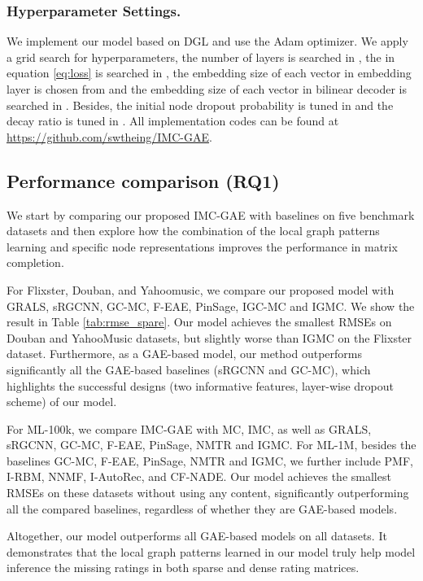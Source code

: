 \documentclass[sigconf]{acmart}
\begin{document}
\subsubsection{Hyperparameter Settings.} We implement our model based on DGL \cite{wang2019deep} and use the Adam optimizer. We apply a grid search for hyperparameters, the number of layers is searched in , the  in equation \ref{eq:loss} is searched in , the embedding size of each vector in embedding layer is chosen from  and the embedding size of each vector in bilinear decoder is searched in . Besides, the initial node dropout probability is tuned in  and the decay ratio  is tuned in . 
All implementation codes can be found at \url{https://github.com/swtheing/IMC-GAE}.



\subsection{Performance comparison (RQ1)}
We start by comparing our proposed IMC-GAE with baselines on five benchmark datasets and then explore how the combination of the local graph patterns learning and specific node representations improves the performance in matrix completion.

For Flixster, Douban, and Yahoomusic, we compare our proposed model with GRALS, sRGCNN, GC-MC, F-EAE, PinSage, IGC-MC and IGMC. We show the result in Table \ref{tab:rmse_spare}. Our model achieves the smallest RMSEs on Douban and YahooMusic datasets, but slightly worse than IGMC on the Flixster dataset. Furthermore, as a GAE-based model, our method outperforms significantly all the GAE-based baselines (sRGCNN and GC-MC), which highlights the successful designs (two informative features, layer-wise dropout scheme) of our model.    

For ML-100k, we compare IMC-GAE with MC, IMC, as well as GRALS, sRGCNN, GC-MC, F-EAE, PinSage, NMTR and IGMC. For ML-1M, besides the baselines GC-MC, F-EAE, PinSage, NMTR and IGMC, we further include PMF, I-RBM, NNMF, I-AutoRec, and CF-NADE. Our model achieves the smallest RMSEs on these datasets without using any content, significantly outperforming all the compared baselines, regardless of whether they are GAE-based models. 

Altogether, our model outperforms all GAE-based models on all datasets. It demonstrates that the local graph patterns learned in our model truly help model inference the missing ratings in both sparse and dense rating matrices. 
\end{document}
